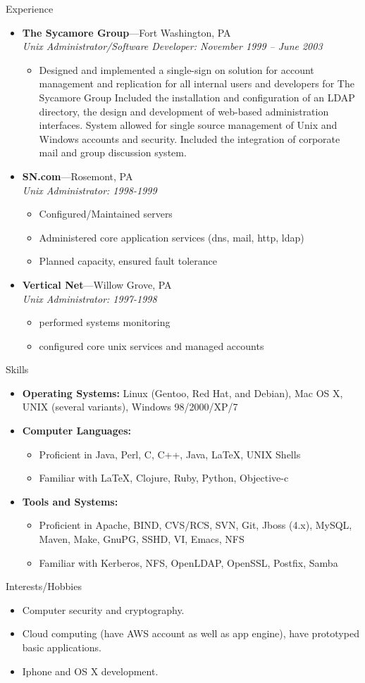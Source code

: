 \documentclass[11pt,oneside]{article}
\newenvironment{ressection}[1]{
	\vspace{4pt}
	{\fontfamily{phv}\selectfont\Large#1}
	\begin{itemize}
	\vspace{3pt}
}{
	\end{itemize}
}
\newcommand{\resitem}[1]{
	\vspace{-4pt}
	\item \begin{flushleft} #1 \end{flushleft}
}
\newcommand{\ressubitem}[1]{
	\vspace{-1pt}
	\item \begin{flushleft} #1 \end{flushleft}
}
\newcommand{\resbigitem}[3]{
	\vspace{-5pt}
	\item
	\textbf{#1}---#2 \\
	\textit{#3}
}
\newenvironment{ressubsec}[3]{
	\resbigitem{#1}{#2}{#3}
	\vspace{-2pt}
	\begin{itemize}
}{
	\end{itemize}
}
\newenvironment{reslist}[1]{
	\resitem{\textbf{#1}}
	\vspace{-5pt}
	\begin{itemize}
}{
	\end{itemize}
}
\begin{document}
\begin{ressection}{Experience}
\begin{ressubsec}{The Sycamore Group}{Fort Washington, PA}{Unix Administrator/Software Developer: November 1999 -- June 2003}
	        \ressubitem{Designed and implemented a single-sign on solution for account management and replication for all internal users and developers for The Sycamore Group Included the installation and configuration of an LDAP directory, the design and development of web-based administration interfaces. System allowed for single source management of Unix and Windows accounts and security. Included the integration of corporate mail and group discussion system. }
    \end{ressubsec}
	\begin{ressubsec}{SN.com}{Rosemont, PA}{Unix Administrator: 1998-1999}
		\ressubitem{Configured/Maintained servers}
		\ressubitem{Administered core application services (dns, mail, http, ldap)}
		\ressubitem{Planned capacity, ensured fault tolerance}
	\end{ressubsec}
	\begin{ressubsec}{Vertical Net}{Willow Grove, PA}{Unix Administrator: 1997-1998}
		\ressubitem{performed systems monitoring}
		\ressubitem{configured core unix services and managed accounts}
	\end{ressubsec}
\end{ressection}


\begin{ressection}{Skills}

	\resitem{\textbf{Operating Systems:} Linux (Gentoo, Red Hat, and Debian), Mac OS X, UNIX (several variants), Windows 98/2000/XP/7}

	\begin{reslist}{Computer Languages:}

		\ressubitem{Proficient in Java, Perl, C, C++, Java, \LaTeX, UNIX Shells}

		\ressubitem{Familiar with \LaTeX, Clojure, Ruby, Python, Objective-c}

	\end{reslist}

	\begin{reslist}{Tools and Systems:}

		\ressubitem{Proficient in Apache, BIND, CVS/RCS, SVN, Git, Jboss (4.x), MySQL, Maven, Make, GnuPG, SSHD, VI, Emacs, NFS}

		\ressubitem{Familiar with Kerberos, NFS, OpenLDAP, OpenSSL, Postfix, Samba}

	\end{reslist}


\end{ressection}


\begin{ressection}{Interests/Hobbies}

	\resitem{Computer security and cryptography.}
	\resitem{Cloud computing (have AWS account as well as app engine), have prototyped basic applications.}
	\resitem{Iphone and OS X development.}

\end{ressection}
\end{document}
